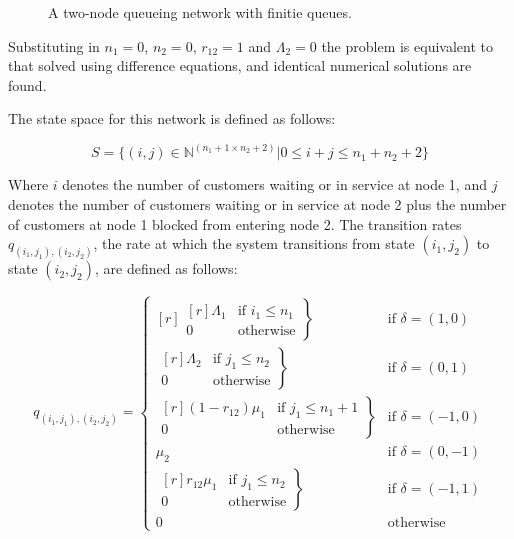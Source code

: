 \documentclass{article}
\begin{document}
\begin{figure}[H]
    
    \caption{A two-node queueing network with finitie queues.}
    \label{fig:2nodesQs}
\end{figure}

Substituting in $n_1 = 0$, $n_2 = 0$, $r_{12} = 1$ and $\Lambda_2 = 0$ the problem is equivalent to that solved using difference equations, and identical numerical solutions are found.

The state space for this network is defined as follows:

\begin{equation*}
    S = \{(i,j)\in\mathbb{N}^{(n_1+1\times n_2+2)}| 0 \leq i + j \leq n_1 + n_2 + 2\}
\end{equation*}

Where $i$ denotes the number of customers waiting or in service at node 1, and $j$ denotes the number of customers waiting or in service at node 2 plus the number of customers at node 1 blocked from entering node 2.
The transition rates $q_{(i_1, j_1),(i_2, j_2)}$, the rate at which the system transitions from state $(i_1, j_2)$ to state $(i_2, j_2)$, are defined as follows:

\begin{equation}
  q_{(i_1, j_1),(i_2, j_2)} = \left\{
  \begin{matrix*}[ r ]
    \left. \begin{matrix*}[ r ]
      \Lambda_1 & \text{if } i_1 \leq n_1 \\
      0 & \text{otherwise}
    \end{matrix*} \right\} & \text{if } \delta = (1, 0) \\
    \left. \begin{matrix*}[ r ]
      \Lambda_2 & \text{if } j_1 \leq n_2 \\
      0 & \text{otherwise}
    \end{matrix*} \right\} & \text{if } \delta = (0, 1) \\
    \left. \begin{matrix*}[ r ]
      (1 - r_{12})\mu_1 & \text{if } j_1 \leq n_1 + 1 \\
      0 & \text{otherwise}
    \end{matrix*} \right\} & \text{if } \delta = (-1, 0) \\
    \mu_2 & \text{if } \delta = (0, -1) \\
    \left. \begin{matrix*}[ r ]
      r_{12}\mu_1 & \text{if } j_1 \leq n_2 \\
      0 & \text{otherwise}
    \end{matrix*} \right\} & \text{if } \delta = (-1, 1) \\
    0 & \text{otherwise}
  \end{matrix*} \right.
\end{equation}
\end{document}
